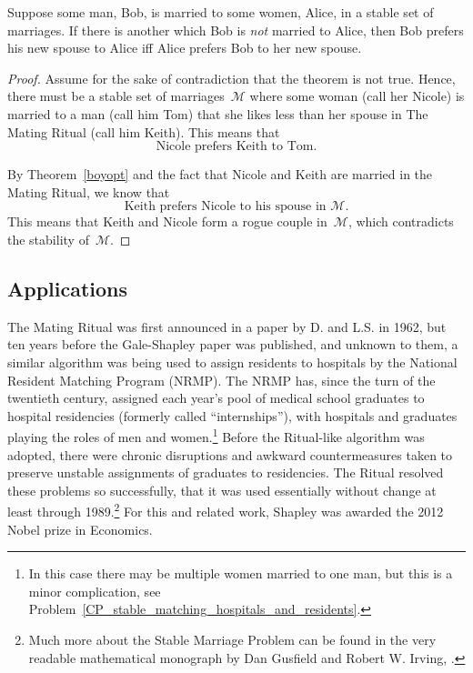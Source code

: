 Suppose some man, Bob, is married to some women, Alice, in a stable
set of marriages.  If there is another 
which Bob is \emph{not} married to Alice, then Bob prefers his new
spouse to Alice iff Alice prefers Bob to her new spouse.

\begin{proof}
Assume for the sake of contradiction that the theorem is not true.
Hence, there must be a stable set of marriages~$\mathcal{M}$ where some
woman (call her Nicole) is married to a man (call him Tom) that she
likes less than her spouse in The Mating Ritual (call him Keith).
This means that
\begin{equation}
\text{Nicole prefers Keith to Tom.} \tag{+}
\end{equation}

By Theorem~\ref{boyopt} and the fact that Nicole and Keith are married
in the Mating Ritual, we know that 
\begin{equation}\tag{++}
\text{Keith prefers Nicole to his spouse in~$\mathcal{M}$.}
\end{equation}
This means that Keith and Nicole form a rogue couple in~$\mathcal{M}$,
which contradicts the stability of~$\mathcal{M}$.
\end{proof}
\fi

\subsection{Applications}

The Mating Ritual was first announced in a paper by D.  and
L.S.  in 1962, but ten years before the Gale-Shapley
paper was published, and unknown to them, a similar algorithm was
being used to assign residents to hospitals by the National Resident
Matching Program (NRMP).
\iffalse
\footnote{Of course, there is no serenading going on in the
  hospitals---the preferences are submitted to a program and the whole
  process is carried out by a computer.}  \fi The NRMP has, since the
turn of the twentieth century, assigned each year's pool of medical
school graduates to hospital residencies (formerly called
``internships''), with hospitals and graduates playing the roles of
men and women.\footnote{In this case there may be multiple women
  married to one man, but this is a minor complication, see
  Problem~\ref{CP_stable_matching_hospitals_and_residents}.}  Before
the Ritual-like algorithm was adopted, there were chronic disruptions
and awkward countermeasures taken to preserve unstable assignments of
graduates to residencies.  The Ritual resolved these problems so
successfully, that it was used essentially without change at least
through 1989.\footnote{Much more about the Stable Marriage Problem can
  be found in the very readable mathematical monograph by Dan Gusfield
  and Robert W. Irving,
  \href{http://mitpress.mit.edu/catalog/item/default.asp?ttype=2&tid=7676}
       {\cite{Gusfield1989}}.}  For this and related work, Shapley was
awarded the 2012 Nobel prize in Economics.

